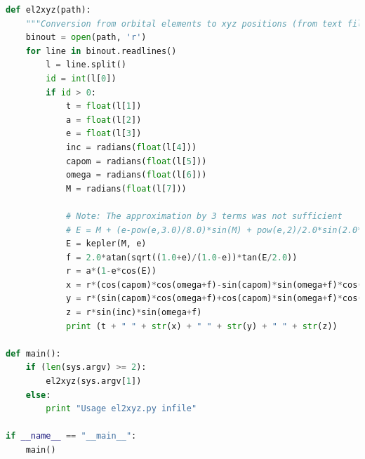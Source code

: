 \documentclass[A4paper, 12pt, oneside]{book}
\begin{document}
\begin{appendices}
\begin{lstlisting}[language=Python]
def el2xyz(path):
    """Conversion from orbital elements to xyz positions (from text file bin.out by program follow2)"""
    binout = open(path, 'r')
    for line in binout.readlines()
        l = line.split()
        id = int(l[0])
        if id > 0:
            t = float(l[1])
            a = float(l[2])
            e = float(l[3])
            inc = radians(float(l[4]))
            capom = radians(float(l[5]))
            omega = radians(float(l[6]))
            M = radians(float(l[7]))
    
            # Note: The approximation by 3 terms was not sufficient
            # E = M + (e-pow(e,3.0)/8.0)*sin(M) + pow(e,2)/2.0*sin(2.0*M) + pow(e,3)*3.0/8.0*sin(3.0*M)
            E = kepler(M, e)
            f = 2.0*atan(sqrt((1.0+e)/(1.0-e))*tan(E/2.0))
            r = a*(1-e*cos(E))
            x = r*(cos(capom)*cos(omega+f)-sin(capom)*sin(omega+f)*cos(inc))
            y = r*(sin(capom)*cos(omega+f)+cos(capom)*sin(omega+f)*cos(inc))
            z = r*sin(inc)*sin(omega+f)
            print (t + " " + str(x) + " " + str(y) + " " + str(z))

def main():
    if (len(sys.argv) >= 2):
        el2xyz(sys.argv[1])
    else:
        print "Usage el2xyz.py infile"

if __name__ == "__main__":
    main()
	\end{lstlisting}
\end{appendices}
\end{document}
